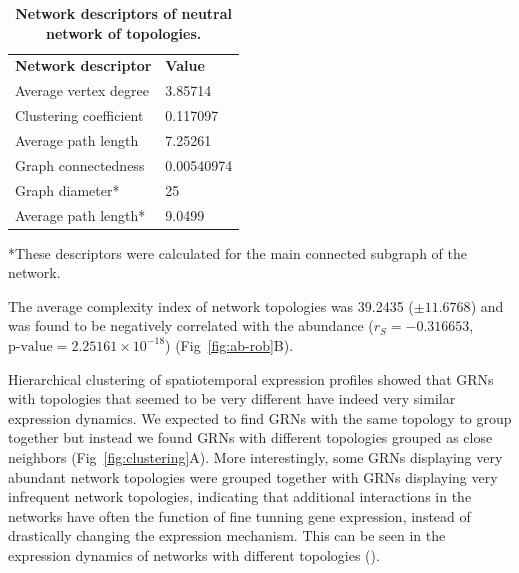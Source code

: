 \documentclass[10pt,letterpaper]{article}
\newlength\savedwidth
\newcommand\thickhline{\noalign{\global\savedwidth\arrayrulewidth\global\arrayrulewidth 2pt}%
\hline
\noalign{\global\arrayrulewidth\savedwidth}}
\begin{document}
\begin{table}[!ht]
 \centering
 \caption{{\bf Network descriptors of neutral network of topologies.}}
 \begin{tabular}{|l|l|}
 \hline
 {\bf Network descriptor} & {\bf Value}\\ \thickhline
 Average vertex degree  & 3.85714 \\ \hline
 Clustering coefficient~\cite{Watts1998} & 0.117097 \\ \hline
 Average path length    & 7.25261       \\ \hline
 Graph connectedness    & 0.00540974    \\ \hline
 Graph diameter*        & 25            \\ \hline
 Average path length*   & 9.0499        \\ \hline
 \end{tabular}
 \begin{flushleft} *These descriptors were calculated for the main connected
 subgraph of the network.
 \end{flushleft}
 \label{table1}
 \end{table}

The average complexity index of network topologies was 39.2435 ($\pm 11.6768$)
and was found to be negatively correlated with the abundance ($r_S = -0.316653$,
$\text{p-value} = 2.25161\times10^{-18}$) (Fig~\ref{fig:ab-rob}B).

Hierarchical clustering of spatiotemporal expression profiles showed that GRNs
with topologies that seemed to be very different have indeed very similar
expression dynamics. We expected to find GRNs with the same topology to group
together but instead we found GRNs with different topologies grouped as close
neighbors (Fig~\ref{fig:clustering}A). More interestingly, some GRNs displaying
very abundant network topologies were grouped together with GRNs displaying
very infrequent network topologies, indicating that additional interactions
in the networks have often the function of fine tunning gene expression, instead
of drastically changing the expression mechanism. This can be seen in the
expression dynamics of networks with different topologies ().
\end{document}
